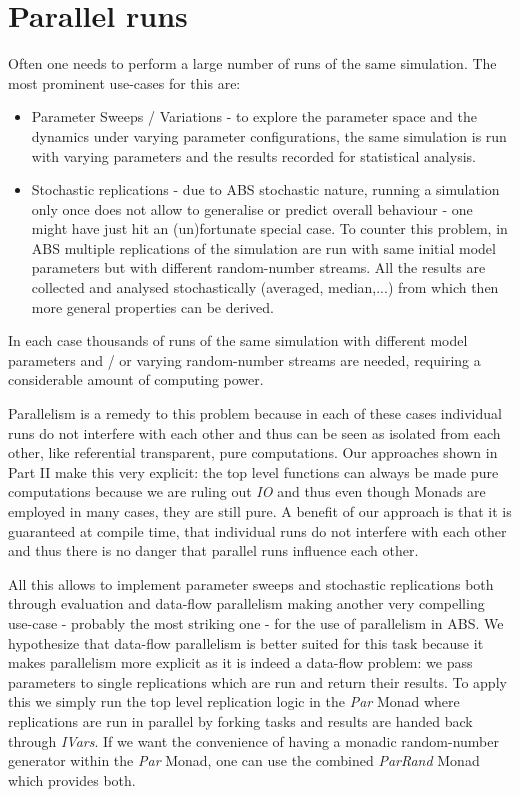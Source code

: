 \section{Parallel runs}
Often one needs to perform a large number of runs of the same simulation. The most prominent use-cases for this are:

\begin{itemize}
	\item Parameter Sweeps / Variations - to explore the parameter space and the dynamics under varying parameter configurations, the same simulation is run with varying parameters and the results recorded for statistical analysis.
	
	\item Stochastic replications - due to ABS stochastic nature, running a simulation only once does not allow to generalise or predict overall behaviour - one might have just hit an (un)fortunate special case. To counter this problem, in ABS multiple replications of the  simulation are run with same initial model parameters but with different random-number streams. All the results are collected and analysed stochastically (averaged, median,...) from which then more general properties can be derived.
\end{itemize}

In each case thousands of runs of the same simulation with different model parameters and / or varying random-number streams are needed, requiring a considerable amount of computing power.

Parallelism is a remedy to this problem because in each of these cases individual runs do not interfere with each other and thus can be seen as isolated from each other, like referential transparent, pure computations. Our approaches shown in Part II make this very explicit: the top level functions can always be made pure computations because we are ruling out \textit{IO} and thus even though Monads are employed in many cases, they are still pure. A benefit of our approach is that it is guaranteed at compile time, that individual runs do not interfere with each other and thus there is no danger that parallel runs influence each other. 

All this allows to implement parameter sweeps and stochastic replications both through evaluation and data-flow parallelism making another very compelling use-case - probably the most striking one - for the use of parallelism in ABS. We hypothesize that data-flow parallelism is better suited for this task because it makes parallelism more explicit as it is indeed a data-flow problem: we pass parameters to single replications which are run and return their results. To apply this we simply run the top level replication logic in the \textit{Par} Monad where replications are run in parallel by forking tasks and results are handed back through \textit{IVars}. If we want the convenience of having a monadic random-number generator within the \textit{Par} Monad, one can use the combined \textit{ParRand} Monad which provides both.
